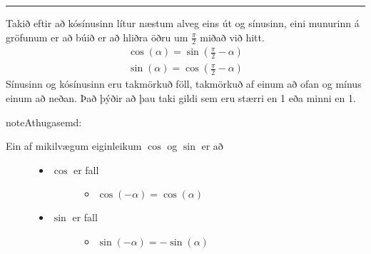\documentclass[a4paper,10pt,icelandic]{sphinxmanual}
\begin{document}



\bigskip\hrule\bigskip


Takið eftir að kósínusinn lítur næstum alveg eins út og sínusinn, eini munurinn á gröfunum er að búið er að hliðra öðru um \(\frac{\pi}{2}\) miðað við hitt.
\begin{equation*}
\begin{split}\cos(\alpha) = \sin\left(\frac{\pi}{2} - \alpha\right)\end{split}
\end{equation*}\begin{equation*}
\begin{split}\sin(\alpha) = \cos\left(\frac{\pi}{2} - \alpha\right)\end{split}
\end{equation*}
Sínusinn og kósínusinn eru takmörkuð föll, takmörkuð af einum að ofan og mínus einum að neðan.
Það þýðir að þau taki  gildi sem eru stærri en 1 eða minni en \sphinxhyphen{}1.

\begin{sphinxadmonition}{note}{Athugasemd:}\begin{description}
\item[{Ein af mikilvægum eiginleikum \(\cos\) og \(\sin\) er að}] \leavevmode\begin{itemize}
\item {} \begin{description}
\item[{\(\cos\) er  fall}] \leavevmode\begin{itemize}
\item {} 
\(\cos(-\alpha) = \cos(\alpha)\)

\end{itemize}

\end{description}

\item {} \begin{description}
\item[{\(\sin\) er  fall}] \leavevmode\begin{itemize}
\item {} 
\(\sin(-\alpha) = -\sin(\alpha)\)

\end{itemize}

\end{description}

\end{itemize}

\end{description}
\end{sphinxadmonition}
\end{document}
